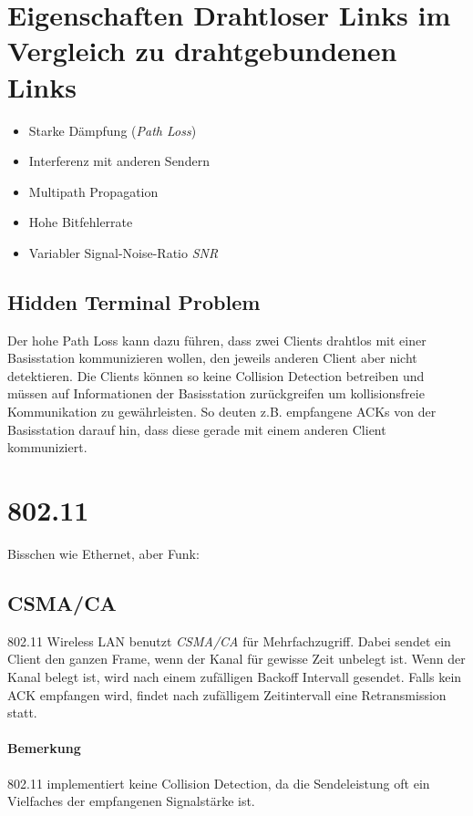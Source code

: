 \section{Eigenschaften Drahtloser Links im Vergleich zu drahtgebundenen Links}
\begin{itemize}
    \item Starke Dämpfung (\emph{Path Loss})
    \item Interferenz mit anderen Sendern
    \item Multipath Propagation
    \item Hohe Bitfehlerrate
    \item Variabler Signal-Noise-Ratio \emph{SNR}
\end{itemize}

\subsection{Hidden Terminal Problem}
Der hohe Path Loss kann dazu führen, dass zwei Clients drahtlos mit einer Basisstation kommunizieren wollen, den jeweils anderen Client aber nicht detektieren.
Die Clients können so keine Collision Detection betreiben und müssen auf Informationen der Basisstation zurückgreifen um kollisionsfreie Kommunikation zu gewährleisten.
So deuten z.B. empfangene ACKs von der Basisstation darauf hin, dass diese gerade mit einem anderen Client kommuniziert.

\section{802.11}
Bisschen wie Ethernet, aber Funk:
\subsection{CSMA/CA}
802.11 Wireless LAN benutzt \emph{CSMA/CA} für Mehrfachzugriff. Dabei sendet ein Client den ganzen Frame, wenn der Kanal für gewisse Zeit unbelegt ist. Wenn der Kanal belegt ist, wird nach einem zufälligen Backoff Intervall gesendet. Falls kein ACK empfangen wird, findet nach zufälligem Zeitintervall eine Retransmission statt.
\paragraph{Bemerkung} 802.11 implementiert keine Collision Detection, da die Sendeleistung oft ein Vielfaches der empfangenen Signalstärke ist.